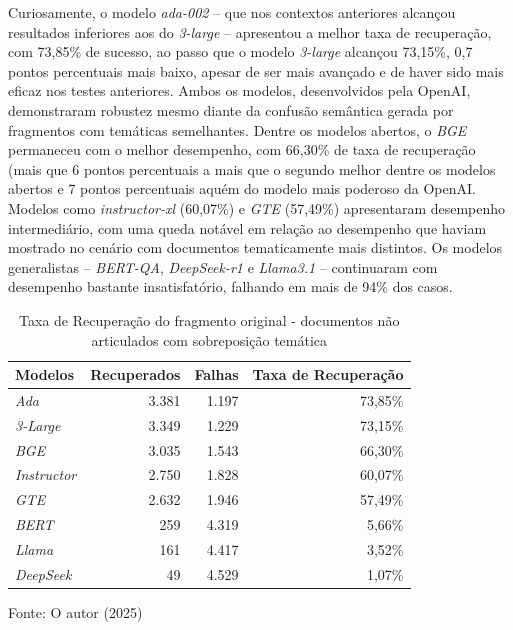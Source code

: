 Curiosamente, o modelo \textit{ada-002} -- que nos contextos anteriores alcançou resultados inferiores aos do \textit{3-large} --  apresentou a melhor taxa de recuperação, com 73,85\% de sucesso, ao passo que o modelo \textit{3-large} alcançou 73,15\%, 0,7 pontos percentuais mais baixo, apesar de ser mais avançado e de haver sido mais eficaz nos testes anteriores. Ambos os modelos, desenvolvidos pela OpenAI, demonstraram robustez mesmo diante da confusão semântica gerada por fragmentos com temáticas semelhantes. Dentre os modelos abertos, o \textit{BGE} permaneceu com o melhor desempenho, com 66,30\% de taxa de recuperação (mais que 6 pontos percentuais a mais que o segundo melhor dentre os modelos abertos e 7 pontos percentuais aquém do modelo mais poderoso da OpenAI. Modelos como \textit{instructor-xl} (60,07\%) e \textit{GTE} (57,49\%) apresentaram desempenho intermediário, com uma queda notável em relação ao desempenho que haviam mostrado no cenário com documentos tematicamente mais distintos. Os modelos generalistas -- \textit{BERT-QA}, \textit{DeepSeek-r1} e \textit{Llama3.1} -- continuaram com desempenho bastante insatisfatório, falhando em mais de 94\% dos casos.

\begin{table}[H]
    \caption{Taxa de Recuperação do fragmento original - documentos não articulados com sobreposição temática}
    \centering
    \begin{tabular}{ l r r r }
        \hline
        \textbf{Modelos} & \textbf{Recuperados} & \textbf{Falhas} & \textbf{Taxa de Recuperação} \\
        \hline
        \textit{Ada} & 3.381 & 1.197 & 73,85\% \\
        \textit{3-Large} & 3.349 & 1.229 & 73,15\% \\
        \textit{BGE} & 3.035 & 1.543 & 66,30\% \\
        \textit{Instructor} & 2.750 & 1.828 & 60,07\% \\
        \textit{GTE} & 2.632 & 1.946 & 57,49\% \\
        \textit{BERT} & 259 & 4.319 & 5,66\% \\
        \textit{Llama} & 161 & 4.417 & 3,52\% \\
        \textit{DeepSeek} & 49 & 4.529 & 1,07\% \\
        \hline
    \end{tabular}
    
    Fonte: O autor (2025)
    \label{tab:recuperacao-top-noticias}
\end{table}

